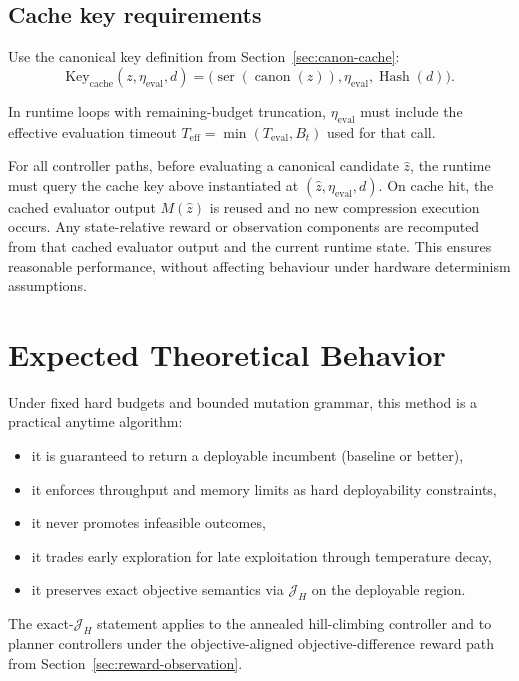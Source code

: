 \documentclass[11pt]{article}
\begin{document}
\subsection{Cache key requirements}

Use the canonical key definition from Section~\ref{sec:canon-cache}:
\[
\mathrm{Key}_{\mathrm{cache}}(z,\eta_{\mathrm{eval}},d)=
\Big(\operatorname{ser}(\operatorname{canon}(z)),\eta_{\mathrm{eval}},\operatorname{Hash}(d)\Big).
\]

In runtime loops with remaining-budget truncation,
$\eta_{\mathrm{eval}}$ must include the effective evaluation timeout
$T_{\mathrm{eff}}=\min(T_{\mathrm{eval}},B_t)$ used for that call.

For all controller paths, before evaluating a canonical candidate $\hat z$, the
runtime must query the cache key above instantiated at
$(\hat z,\eta_{\mathrm{eval}},d)$. On cache hit, the cached evaluator output
$M(\hat z)$ is reused and no new compression execution occurs. Any
state-relative reward or observation components are recomputed from that cached
evaluator output and the current runtime state. This ensures reasonable
performance, without affecting behaviour under hardware determinism
assumptions.

\section{Expected Theoretical Behavior}\label{sec:expected-theoretical-behavior}

Under fixed hard budgets and bounded mutation grammar, this method is a practical anytime algorithm:
\begin{itemize}
    \item it is guaranteed to return a deployable incumbent (baseline or better),
    \item it enforces throughput and memory limits as hard deployability constraints,
    \item it never promotes infeasible outcomes,
    \item it trades early exploration for late exploitation through temperature decay,
    \item it preserves exact objective semantics via $\mathcal{J}_H$ on the deployable region.
\end{itemize}

The exact-$\mathcal{J}_H$ statement applies to the annealed hill-climbing
controller and to planner controllers under the objective-aligned
objective-difference reward path from
Section~\ref{sec:reward-observation}.
\end{document}
